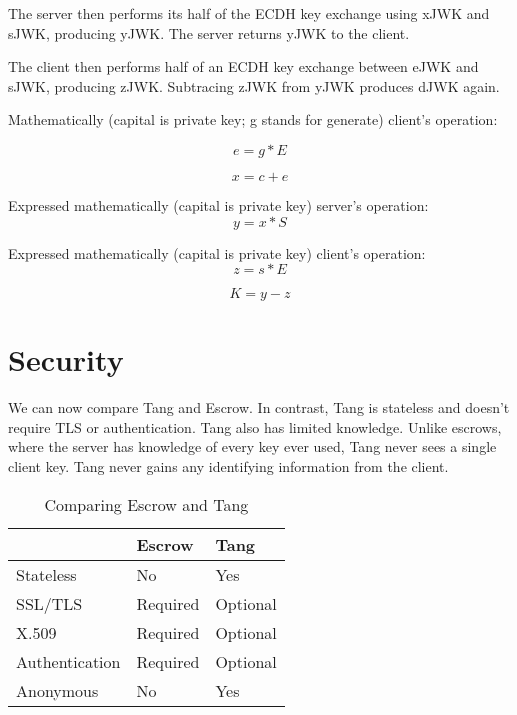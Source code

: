 \documentclass[../xdudla00-porting-Tang-to-Open-WRT.tex]{subfiles}
\begin{document}
The server then performs its half of the ECDH key exchange using xJWK and sJWK, producing yJWK. The server returns yJWK to the client.

The client then performs half of an ECDH key exchange between eJWK and sJWK, producing zJWK. Subtracing zJWK from yJWK produces dJWK again.

Mathematically (capital is private key; g stands for generate) client's operation:

\begin{equation}
    e = g * E
\end{equation}

\begin{equation}
    x = c + e
\end{equation}

Expressed mathematically (capital is private key) server's operation:
\begin{equation}
    y = x * S
\end{equation}

Expressed mathematically (capital is private key) client's operation:
\begin{equation}
    z = s * E
\end{equation}

\begin{equation}
    K = y - z
\end{equation}

\section{Security}

We can now compare Tang and Escrow. In contrast, Tang is stateless and doesn't require TLS \cite{tls} or authentication.
Tang also has limited knowledge. Unlike escrows, where the server has knowledge of every key ever used, Tang never sees a single client key.
Tang never gains any identifying information from the client.

\begin{table}[h]
\centering
\label{compare}
\begin{tabular}{@{}lll@{}}
\toprule
               & Escrow   & Tang                         \\ \midrule
Stateless      & No       & Yes                          \\
SSL/TLS        & Required & Optional                     \\
X.509          & Required & Optional                     \\
Authentication & Required & Optional                     \\
Anonymous      & No       & Yes                          \\ \bottomrule
\end{tabular}
\caption{Comparing Escrow and Tang}
\end{table}
\end{document}
